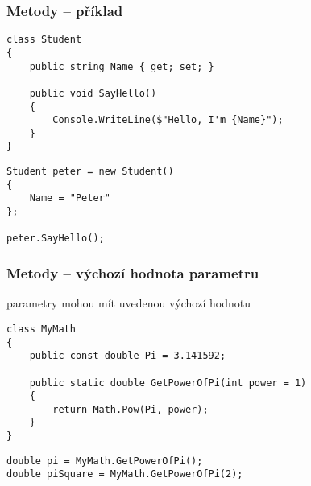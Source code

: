 \begin{frame}[fragile]
\frametitle{Metody -- příklad}
\begin{yesblock}
\begin{lstlisting}[basicstyle=\small]
class Student
{
    public string Name { get; set; }

    public void SayHello()
    {
        Console.WriteLine($"Hello, I'm {Name}");
    }
}
\end{lstlisting}
\end{yesblock}

\begin{yesblock}
\begin{lstlisting}[basicstyle=\small]
Student peter = new Student()
{
    Name = "Peter"
};

peter.SayHello();
\end{lstlisting}
\end{yesblock}
\end{frame}





\begin{frame}[fragile]
\frametitle{Metody -- výchozí hodnota parametru}
\begin{bitemize}{}
\item parametry mohou mít uvedenou výchozí hodnotu
\end{bitemize}

\begin{yesblock}
\begin{lstlisting}[basicstyle=\small]
class MyMath
{
    public const double Pi = 3.141592;

    public static double GetPowerOfPi(int power = 1)
    {
        return Math.Pow(Pi, power);
    }
}
\end{lstlisting}
\end{yesblock}

\begin{yesblock}
\begin{lstlisting}[basicstyle=\small]
double pi = MyMath.GetPowerOfPi();
double piSquare = MyMath.GetPowerOfPi(2);
\end{lstlisting}
\end{yesblock}
\end{frame}




